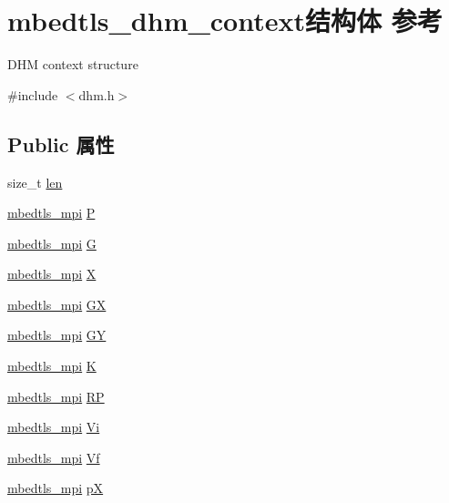 \hypertarget{structmbedtls__dhm__context}{}\section{mbedtls\+\_\+dhm\+\_\+context结构体 参考}
\label{structmbedtls__dhm__context}


D\+HM context structure  




{\ttfamily \#include $<$dhm.\+h$>$}

\subsection*{Public 属性}
\begin{DoxyCompactItemize}
\item 
size\+\_\+t \hyperlink{structmbedtls__dhm__context_aaadf5b8713eeb657004c50742d9e26b1}{len}
\item 
\hyperlink{structmbedtls__mpi}{mbedtls\+\_\+mpi} \hyperlink{structmbedtls__dhm__context_a94404f47038e146712b25d142ea4abd0}{P}
\item 
\hyperlink{structmbedtls__mpi}{mbedtls\+\_\+mpi} \hyperlink{structmbedtls__dhm__context_a4fa0b65bab8ce280ffab2df4285b7ee1}{G}
\item 
\hyperlink{structmbedtls__mpi}{mbedtls\+\_\+mpi} \hyperlink{structmbedtls__dhm__context_a175e534f5a3a4483ebcc4d7ec852d4cd}{X}
\item 
\hyperlink{structmbedtls__mpi}{mbedtls\+\_\+mpi} \hyperlink{structmbedtls__dhm__context_ac33a9d76870e8a807e1d0d9bf77fe85e}{GX}
\item 
\hyperlink{structmbedtls__mpi}{mbedtls\+\_\+mpi} \hyperlink{structmbedtls__dhm__context_a834d14fb13ba02b1d604c306d0792bca}{GY}
\item 
\hyperlink{structmbedtls__mpi}{mbedtls\+\_\+mpi} \hyperlink{structmbedtls__dhm__context_a2226d2a7380caf66c6e962e8d5edbb41}{K}
\item 
\hyperlink{structmbedtls__mpi}{mbedtls\+\_\+mpi} \hyperlink{structmbedtls__dhm__context_ae1801da339af972ee271f947b3fe3734}{RP}
\item 
\hyperlink{structmbedtls__mpi}{mbedtls\+\_\+mpi} \hyperlink{structmbedtls__dhm__context_a21fea3aadf6f05d8aa42c79e55c5d98c}{Vi}
\item 
\hyperlink{structmbedtls__mpi}{mbedtls\+\_\+mpi} \hyperlink{structmbedtls__dhm__context_a1ebf1105240ca26820edb81f41dd6180}{Vf}
\item 
\hyperlink{structmbedtls__mpi}{mbedtls\+\_\+mpi} \hyperlink{structmbedtls__dhm__context_abd0b3459e4a58e2b29b3bd29f6358319}{pX}
\end{DoxyCompactItemize}


